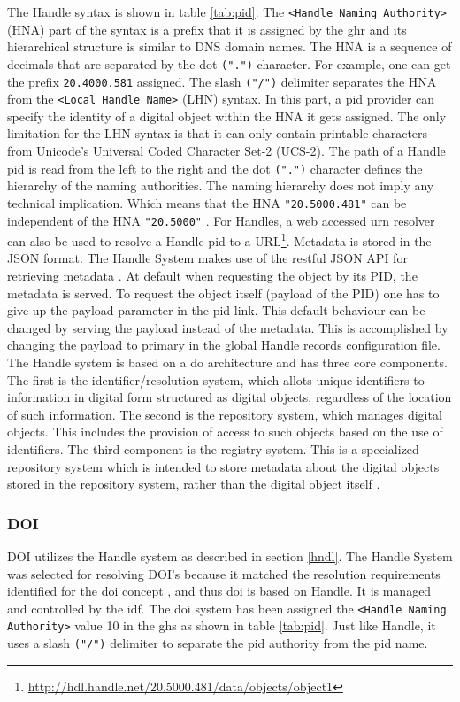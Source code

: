 The Handle syntax is shown in table \ref{tab:pid}. The \texttt{\textless Handle Naming Authority\textgreater} (HNA) part of the syntax is a prefix that it is assigned by the \gls{ghr} and its hierarchical structure is similar to DNS domain names. The HNA is a sequence of decimals that are separated by the dot \texttt{(".")} character. For example, one can get the prefix \texttt{20.4000.581} assigned. The slash \texttt{("/")} delimiter separates the HNA from the \texttt{\textless Local Handle Name\textgreater} (LHN) syntax. In this part, a \gls{pid} provider can specify the identity of a digital object within the HNA it gets assigned. The only limitation for the LHN syntax is that it can only contain printable characters from Unicode's Universal Coded Character Set-2 (UCS-2). The path of a Handle \gls{pid} is read from the left to the right and the dot \texttt{(".")} character defines the hierarchy of the naming authorities. The naming hierarchy does not imply any technical implication. Which means that the HNA \texttt{"20.5000.481"} can be independent of the HNA \texttt{"20.5000"} \cite{icn-bd}. For Handles, a web accessed \gls{urn} resolver can also be used to resolve a Handle \gls{pid} to a URL\footnote{\url{http://hdl.handle.net/20.5000.481/data/objects/object1}}. Metadata is stored in the JSON format. %
The Handle System makes use of the restful JSON API for retrieving metadata \cite{hdl-api}. At default when requesting the object by its PID, the metadata is served. To request the object itself (payload of the PID) one has to give up the payload parameter in the \gls{pid} link. This default behaviour can be changed by serving the payload instead of the metadata. This is accomplished by changing the payload to primary in the global Handle records configuration file.
The Handle system is based on a \gls{do} architecture and has three core components. The first is the identifier/resolution system, which allots unique identifiers to information in digital form structured as digital objects, regardless of the location of such information. The second is the repository system, which manages digital objects. This includes the provision of access to such objects based on the use of identifiers. The third component is the registry system. This is a specialized repository system which is intended to store metadata about the digital objects stored in the repository system, rather than the digital object itself \cite{dona-1}.

\subsubsection{DOI}\label{doi}
DOI utilizes the Handle system as described in section \ref{hndl}. The Handle System was selected for resolving DOI's because it matched the resolution requirements identified for the \gls{doi} concept \cite{doi-found}, and thus \gls{doi} is based on Handle. It is managed and controlled by the \gls{idf}. The \gls{doi} system has been assigned the \texttt{<Handle Naming Authority>} value 10 in the \gls{ghs} as shown in table \ref{tab:pid}. Just like Handle, it uses a slash \texttt{("/")} delimiter to separate the \gls{pid} authority from the \gls{pid} name.

